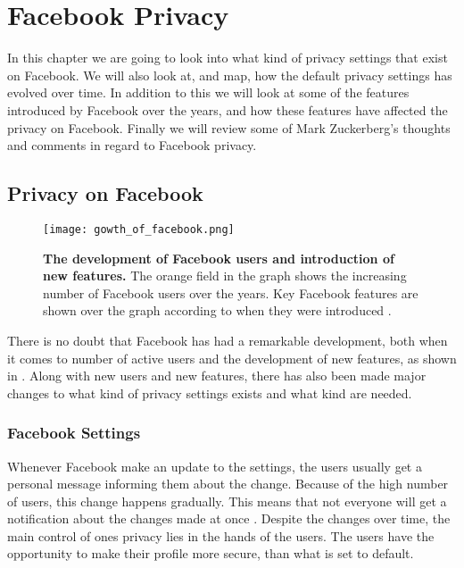 \chapter{Facebook Privacy}
\label{chp:defaultprivacysettings} 

In this chapter we are going to look into what kind of privacy settings that exist on Facebook. We will also look at, and map, how the default privacy settings has evolved over time. In addition to this we will look at some of the features introduced by Facebook over the years, and how these features have affected the privacy on Facebook. Finally we will review some of Mark Zuckerberg's  thoughts and comments in regard to Facebook privacy. 


\section{Privacy on Facebook}\label{sec:privacy_on_facebook}

\begin{figure}[b]
\centering
\texttt{[image: gowth\_of\_facebook.png]}
\caption[The development of Facebook users and introduction of new features]{\textbf{The development of Facebook users and introduction of new features.} The orange field in the graph shows the increasing number of Facebook users over the years. Key Facebook features are shown over the graph according to when they were introduced \cite{BBCFacebookGrowth}.} 
\label{fig:growth_of_facebook}
\end{figure}

There is no doubt that Facebook has had a remarkable development, both when it comes to number of active users and the development of new features, as shown in . Along with new users and new features, there has also been made major changes to what kind of privacy settings exists and what kind are needed. 


\subsection{Facebook Settings}
Whenever Facebook make an update to the settings, the users usually get a personal message informing them about the change. Because of the high number of users, this change happens gradually. This means that not everyone will get a notification about the changes made at once \cite{settingschangingagain}. Despite the changes over time, the main control of ones privacy lies in the hands of the users. The users have the opportunity to make their profile more secure, than what is set to default. 

